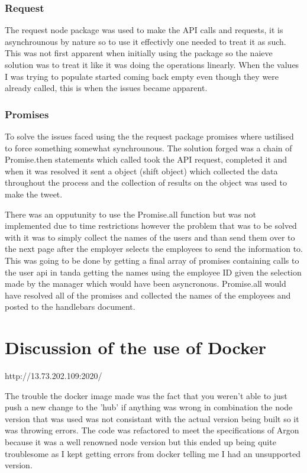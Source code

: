 \documentclass[12pt]{article}
\begin{document}
\subsubsection{Request}
The request node package was used to make the API calls and requests, it is asynchrounous by nature so to use it
effectivly one needed to treat it as such. This was not first apparent when initially using the package so the naieve
solution was to treat it like it was doing the operations linearly. When the values I was trying to populate started
coming back empty even though they were already called, this is when the issues became apparent.

\subsubsection{Promises}
To solve the issues faced using the the request package promises where ustilised to force something somewhat synchrounous.
The solution forged was a chain of Promise.then statements which called took the API request, completed it and when it
was resolved it sent a object (shift object) which collected the data throughout the process and the collection of results on the
object was used to make the tweet.

There was an opputunity to use the Promise.all function but was not implemented due to time restrictions however the problem that was to be solved with it was to simply collect the names of the users and than send them over to the next page
after the employer selects the employees to send the information to. This was going to be done by getting a final array
of promises containing calls to the user api in tanda getting the names using the employee ID given the selection made
by the manager which would have been asyncronous. Promise.all would have resolved all of the promises and collected the
names of the employees and posted to the handlebars document.


\section{Discussion of the use of Docker}
http://13.73.202.109:2020/

The trouble the docker image made was the fact that you weren't able to just push a new change to the 'hub' if anything
was wrong in combination the node version that was used was not consistant with the actual version being built so it was
throwing errors. The code was refactored to meet the specifications of Argon because it was a well renowned node version but
this ended up being quite troublesome as I kept getting errors from docker telling me I had an unsupported version.
\end{document}
